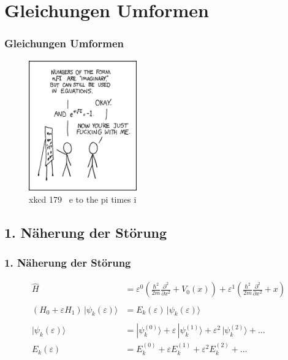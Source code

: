 \documentclass[aspectratio=169]{beamer}
\begin{document}
\section{ Gleichungen Umformen }
\begin{frame}
  \frametitle{ Gleichungen Umformen }
  \begin{figure}
    \centering
    \includegraphics[height=5.6cm]{./179_e_to_the_pi_times_i.png}
    \caption{ xkcd 179 \textendash \ e to the pi times i }
    \label{abb:179_e_to_the_pi_times_i}
  \end{figure}
\end{frame}

\subsection{ 1. N\"aherung der St\"orung }
\begin{frame}
  \frametitle{ 1. N\"aherung der St\"orung }
  \begin{align*}
    \hat{H} &= \varepsilon^0 ( \frac{\hbar^2}{2m} \frac{\partial^2}{\partial x^2} + V_0(x) )
               + \varepsilon^1 ( \frac{\hbar^2}{2m} \frac{\partial^2}{\partial x^2} + x )
  \\
  \\
    (H_0+\varepsilon H_1)\,|\psi_k(\varepsilon)\rangle
    &=
    E_k(\varepsilon)\,|\psi_k(\varepsilon)\rangle
  \\
  \\
    |\psi_k(\varepsilon)\rangle
    &=
    |\psi_k^{(0)}\rangle+\varepsilon\,|\psi_k^{(1)}\rangle
    +\varepsilon^2\,|\psi_k^{(2)}\rangle+\dots
  \\
    E_k(\varepsilon)
    &=
    E_k^{(0)}+\varepsilon E_k^{(1)} + \varepsilon^2 E_k^{(2)}+\dots
  \end{align*}
  
\end{frame}
\end{document}
